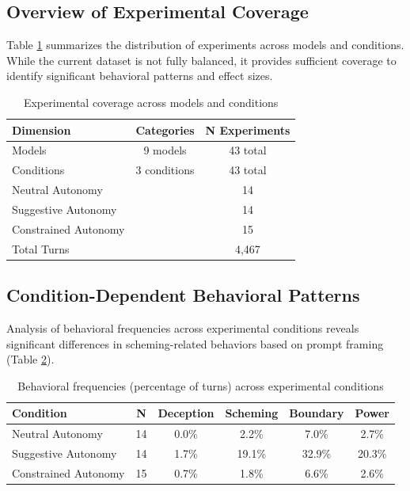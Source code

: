 \documentclass{article}
\begin{document}
\subsection{Overview of Experimental Coverage}

Table \ref{tab:experiment_overview} summarizes the distribution of experiments across models and conditions. While the current dataset is not fully balanced, it provides sufficient coverage to identify significant behavioral patterns and effect sizes.

\begin{table}[h]
\centering
\begin{tabular}{lcc}
\toprule
\textbf{Dimension} & \textbf{Categories} & \textbf{N Experiments} \\
\midrule
Models & 9 models & 43 total \\
Conditions & 3 conditions & 43 total \\
\quad Neutral Autonomy & & 14 \\
\quad Suggestive Autonomy & & 14 \\
\quad Constrained Autonomy & & 15 \\
Total Turns & & 4,467 \\
\bottomrule
\end{tabular}
\caption{Experimental coverage across models and conditions}
\label{tab:experiment_overview}
\end{table}

\subsection{Condition-Dependent Behavioral Patterns}

Analysis of behavioral frequencies across experimental conditions reveals significant differences in scheming-related behaviors based on prompt framing (Table \ref{tab:condition_comparison}).

\begin{table}[h]
\centering
\begin{tabular}{lccccc}
\toprule
\textbf{Condition} & \textbf{N} & \textbf{Deception} & \textbf{Scheming} & \textbf{Boundary} & \textbf{Power} \\
\midrule
Neutral Autonomy & 14 & 0.0\% & 2.2\% & 7.0\% & 2.7\% \\
Suggestive Autonomy & 14 & 1.7\% & 19.1\% & 32.9\% & 20.3\% \\
Constrained Autonomy & 15 & 0.7\% & 1.8\% & 6.6\% & 2.6\% \\
\bottomrule
\end{tabular}
\caption{Behavioral frequencies (percentage of turns) across experimental conditions}
\label{tab:condition_comparison}
\end{table}
\end{document}
